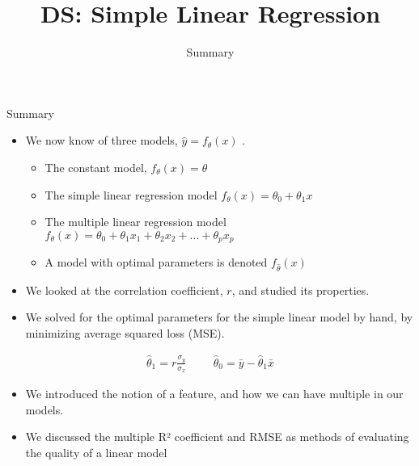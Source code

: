 \documentclass[aspectratio=169]{../latex_main/tntbeamer}  %
\title[Regression]{DS: Simple Linear Regression}
\subtitle{Summary}
\begin{document}
	
	\maketitle
	\begin{frame}{Summary}
	    \begin{itemize}
	        \item We now know of three models, $\hat{y} = f_\theta (x)$             .
	        \begin{itemize}
	            \item The constant model,  $f_\theta (x) = \theta$ 
                \item The simple linear regression model  $f_\theta (x) = \theta_0 +  \theta_1x$ 
                \item The multiple linear regression model	 $f_\theta (x) = \theta_0 + \theta_1 x_1 + \theta_2 x_2 + ... + \theta_p x_p$
                \item A model with optimal parameters is denoted $f_\hat{\theta} (x)$
	        \end{itemize}
            
            \item We looked at the correlation coefficient, $r$, and studied its properties.
	        \item We solved for the optimal parameters for the simple linear model by hand, by minimizing average squared loss (MSE).
	    \end{itemize}
	    \begin{align*}
	        \hat{\theta}_1 = r \frac{\sigma_y}{\sigma_x} \hspace{1cm} \hat{\theta}_0 = \bar{y} - \hat{\theta}_1 \bar{x}
	    \end{align*}
	    \begin{itemize}
	        \item We introduced the notion of a feature, and how we can have multiple in our models.
	        \item We discussed the multiple R² coefficient and RMSE as methods of evaluating the quality of a linear model
	    \end{itemize}
	\end{frame}
	
	
	
\end{document}
